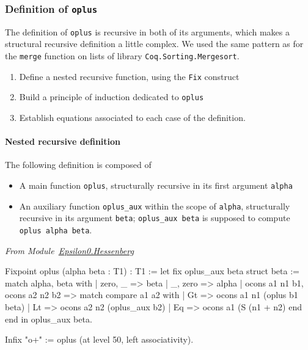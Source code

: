 \documentclass[a4paper]{book}
\begin{document}
\subsubsection{Definition of \texttt{oplus}}
\label{sec:orgheadline84}

The definition of \texttt{oplus} is recursive in both of its 
arguments, which makes a structural recursive definition a little 
complex.
We used the same pattern as for the \texttt{merge} function on lists of library
\texttt{Coq.Sorting.Mergesort}.

\begin{enumerate}
\item Define a nested recursive function, using the \texttt{Fix} 
    construct

\item Build a principle of induction dedicated to \texttt{oplus}

\item Establish equations associated to each case of the definition.
\end{enumerate}

\paragraph{Nested recursive definition}
\label{sec:orgheadline83}

The following definition is composed of 
\begin{itemize}
\item A main function \texttt{oplus}, structurally recursive in its 
first argument \texttt{alpha}
\item An auxiliary function \texttt{oplus\_aux} within the scope of \texttt{alpha},
structurally recursive in its argument \texttt{beta};  \texttt{oplus\_aux beta} 
   is supposed to compute  \texttt{oplus alpha beta}.
\end{itemize}
  
\vspace{4pt}
\emph{From Module~\href{../src/html/hydras.Epsilon0.Hessenberg.html\#oplus}{Epsilon0.Hessenberg}}

\label{sect:infix-oplus}

\begin{Coqsrc}
Fixpoint oplus (alpha beta : T1) : T1 :=
  let fix oplus_aux beta {struct beta} :=
      match alpha, beta with
        | zero, _ => beta
        | _,  zero => alpha
        | ocons a1 n1 b1, ocons a2 n2 b2 =>
          match compare a1 a2 with
            |  Gt => ocons a1 n1 (oplus b1 beta)
            |  Lt => ocons a2 n2 (oplus_aux b2)
            |  Eq => ocons a1 (S (n1 + n2)%
          end
      end
  in oplus_aux beta.

Infix "o+" := oplus  (at level 50, left associativity).
\end{Coqsrc}
\end{document}
